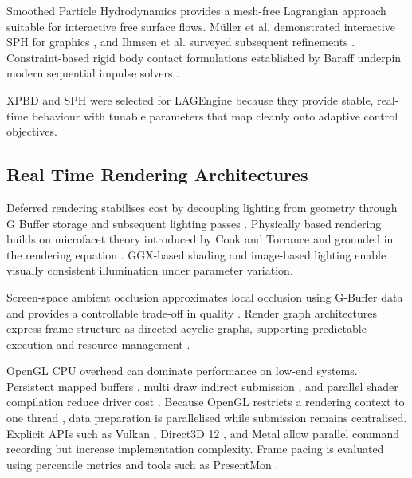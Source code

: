 \documentclass[9pt,openany]{extbook}
\begin{document}
Smoothed Particle Hydrodynamics provides a mesh-free Lagrangian approach suitable for interactive free surface flows. M\"uller et al. demonstrated interactive SPH for graphics \cite{muller2003sph}, and Ihmsen et al. surveyed subsequent refinements \cite{ihmsen2014sph}. Constraint-based rigid body contact formulations established by Baraff underpin modern sequential impulse solvers \cite{baraff1994}.

XPBD and SPH were selected for LAGEngine because they provide stable, real-time behaviour with tunable parameters that map cleanly onto adaptive control objectives.

\subsection{Real Time Rendering Architectures}

Deferred rendering stabilises cost by decoupling lighting from geometry through G Buffer storage and subsequent lighting passes \cite{gregory2018}. Physically based rendering builds on microfacet theory introduced by Cook and Torrance \cite{cook1982} and grounded in the rendering equation \cite{kajiya1986}. GGX-based shading \cite{walter2007} and image-based lighting \cite{debevec1998} enable visually consistent illumination under parameter variation.

Screen-space ambient occlusion approximates local occlusion using G-Buffer data and provides a controllable trade-off in quality \cite{kajalin2009}. Render graph architectures express frame structure as directed acyclic graphs, supporting predictable execution and resource management \cite{wihlidal2017}.

OpenGL CPU overhead can dominate performance on low-end systems. Persistent mapped buffers \cite{arb_buffer_storage}, multi draw indirect submission \cite{arb_multi_draw_indirect}, and parallel shader compilation \cite{arb_parallel_shader_compile} reduce driver cost \cite{azdo_khronos}. Because OpenGL restricts a rendering context to one thread \cite{wglMakeCurrent}, data preparation is parallelised while submission remains centralised. Explicit APIs such as Vulkan \cite{vulkan_threading_spec}, Direct3D 12 \cite{d3d12_cpu_efficiency}, and Metal \cite{metal_execution_model} allow parallel command recording but increase implementation complexity. Frame pacing is evaluated using percentile metrics and tools such as PresentMon \cite{presentmon}.
\end{document}

